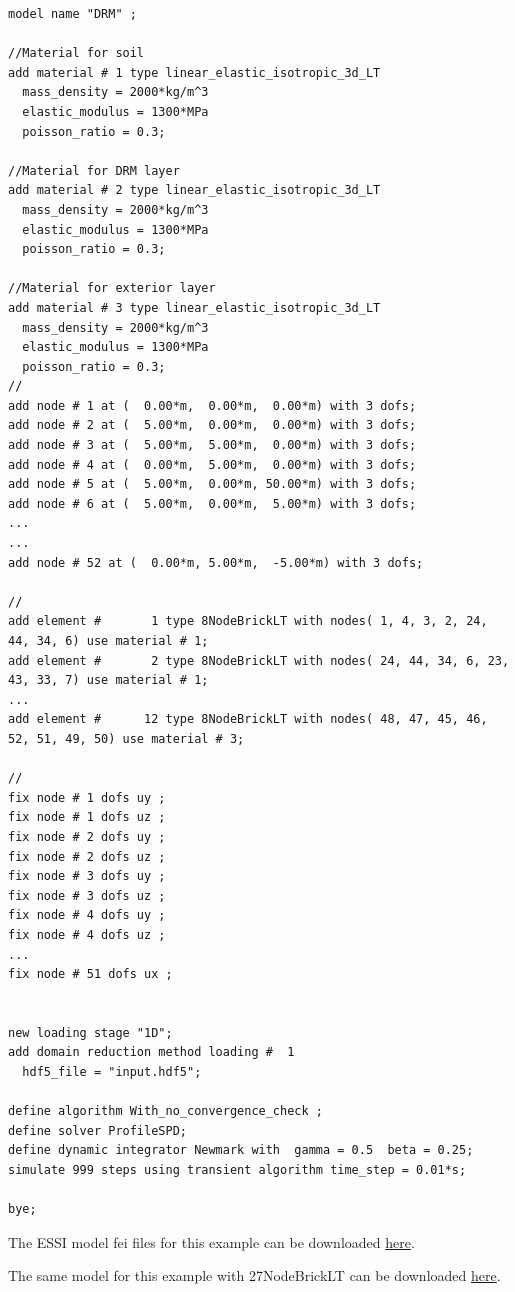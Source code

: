 \documentclass[fleqn,11pt]{article}
\begin{document}
%
\begin{lstlisting}
model name "DRM" ;

//Material for soil
add material # 1 type linear_elastic_isotropic_3d_LT
  mass_density = 2000*kg/m^3
  elastic_modulus = 1300*MPa
  poisson_ratio = 0.3;

//Material for DRM layer
add material # 2 type linear_elastic_isotropic_3d_LT
  mass_density = 2000*kg/m^3
  elastic_modulus = 1300*MPa
  poisson_ratio = 0.3;

//Material for exterior layer
add material # 3 type linear_elastic_isotropic_3d_LT
  mass_density = 2000*kg/m^3
  elastic_modulus = 1300*MPa
  poisson_ratio = 0.3;
//
add node # 1 at (  0.00*m,  0.00*m,  0.00*m) with 3 dofs;
add node # 2 at (  5.00*m,  0.00*m,  0.00*m) with 3 dofs;
add node # 3 at (  5.00*m,  5.00*m,  0.00*m) with 3 dofs;
add node # 4 at (  0.00*m,  5.00*m,  0.00*m) with 3 dofs;
add node # 5 at (  5.00*m,  0.00*m, 50.00*m) with 3 dofs;
add node # 6 at (  5.00*m,  0.00*m,  5.00*m) with 3 dofs;
...
...
add node # 52 at (  0.00*m, 5.00*m,  -5.00*m) with 3 dofs;

//
add element #       1 type 8NodeBrickLT with nodes( 1, 4, 3, 2, 24, 44, 34, 6) use material # 1;
add element #       2 type 8NodeBrickLT with nodes( 24, 44, 34, 6, 23, 43, 33, 7) use material # 1;
...
add element #      12 type 8NodeBrickLT with nodes( 48, 47, 45, 46, 52, 51, 49, 50) use material # 3;

//
fix node # 1 dofs uy ;
fix node # 1 dofs uz ;
fix node # 2 dofs uy ;
fix node # 2 dofs uz ;
fix node # 3 dofs uy ;
fix node # 3 dofs uz ;
fix node # 4 dofs uy ;
fix node # 4 dofs uz ;
...
fix node # 51 dofs ux ;


new loading stage "1D";
add domain reduction method loading #  1
  hdf5_file = "input.hdf5";

define algorithm With_no_convergence_check ;
define solver ProfileSPD;
define dynamic integrator Newmark with  gamma = 0.5  beta = 0.25;
simulate 999 steps using transient algorithm time_step = 0.01*s;

bye;
\end{lstlisting}

The ESSI model fei files for this example can be downloaded 
\href{https://github.com/BorisJeremic/Real-ESSI-Examples/blob/master/model_fei_file/8NodeBrick_DRM_1D/8NodeBrick_DRM_1D.tgz?raw=true}{here}.

The same model for this example with 27NodeBrickLT can be downloaded 
\href{https://github.com/BorisJeremic/Real-ESSI-Examples/blob/master/model_fei_file/27NodeBrick_DRM_1D/27NodeBrick_DRM_1D.tgz?raw=true}{here}.
\end{document}
